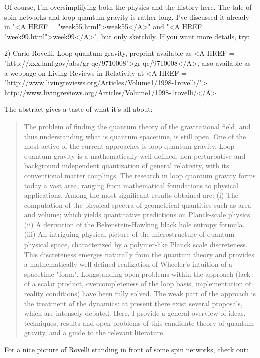 Of course, I'm oversimplifying both the physics and the history here.
The tale of spin networks and loop quantum gravity is rather long.  I've
discussed it already in "<A HREF = "week55.html">week55</A>" and "<A HREF = "week99.html">week99</A>", but only sketchily.  If
you want more details, try:

2) Carlo Rovelli, Loop quantum gravity, preprint available as
<A HREF = "http://xxx.lanl.gov/abs/gr-qc/9710008">gr-qc/9710008</A>,
also available as a webpage on Living Reviews in Relativity at
<A HREF = "http://www.livingreviews.org/Articles/Volume1/1998-1rovelli/">
http://www.livingreviews.org/Articles/Volume1/1998-1rovelli/</A>
 
The abstract gives a taste of what it's all about:

\begin{quote}The problem of finding the quantum theory of the gravitational 
field,
and thus understanding what is quantum spacetime, is still open.  One of
the most active of the current approaches is loop quantum gravity.  Loop
quantum gravity is a mathematically well-defined, non-perturbative and
background independent quantization of general relativity, with its
conventional matter couplings.  The research in loop quantum gravity
forms today a vast area, ranging from mathematical foundations to
physical applications.  Among the most significant results obtained are:
(i) The computation of the physical spectra of geometrical quantities
such as area and volume; which yields quantitative predictions on
Planck-scale physics. 
(ii) A derivation of the Bekenstein-Hawking black
hole entropy formula. 
(iii) An intriguing physical picture of the
microstructure of quantum physical space, characterized by a
polymer-like Planck scale discreteness.  This discreteness emerges
naturally from the quantum theory and provides a mathematically
well-defined realization of Wheeler's intuition of a spacetime "foam".
Longstanding open problems within the approach (lack of a scalar
product, overcompleteness of the loop basis, implementation of reality
conditions) have been fully solved. The weak part of the approach is the
treatment of the dynamics: at present there exist several proposals,
which are intensely debated.  Here, I provide a general overview of
ideas, techniques, results and open problems of this candidate theory of
quantum gravity, and a guide to the relevant literature.\end{quote}

For a nice picture of Rovelli standing in front of some spin networks,
check out:

